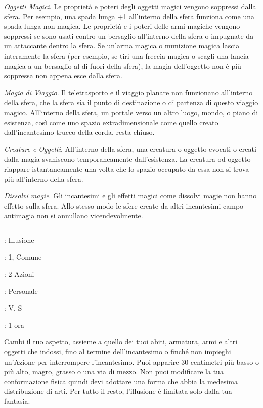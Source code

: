 \begin{multicols}{2}
\emph{Oggetti Magici}. Le proprietà e poteri degli oggetti magici vengono soppressi dalla sfera. Per esempio, una spada lunga +1 all'interno della sfera funziona come una spada lunga non magica. Le proprietà e i poteri delle armi magiche vengono soppressi se sono usati contro un bersaglio all'interno della sfera o impugnate da un attaccante dentro la sfera. Se un'arma magica o munizione magica lascia interamente la sfera (per esempio, se tiri una freccia magica o scagli una lancia magica a un bersaglio al di fuori della sfera), la magia dell'oggetto non è più soppressa non appena esce dalla sfera.

\emph{Magia di Viaggio}. Il teletrasporto e il viaggio planare non funzionano all'interno della sfera, che la sfera sia il punto di destinazione o di partenza di questo viaggio magico. All'interno della sfera, un portale verso un altro luogo, mondo, o piano di esistenza, così come uno spazio extradimensionale come quello creato dall'incantesimo trucco della corda, resta chiuso.

\emph{Creature e Oggetti}. All'interno della sfera, una creatura o oggetto evocati o creati dalla magia svaniscono temporaneamente dall'esistenza. La creatura od oggetto riappare istantaneamente una volta che lo spazio occupato da essa non si trova più all'interno della sfera.

\emph{Dissolvi magie}. Gli incantesimi e gli effetti magici come dissolvi magie non hanno effetto sulla sfera. Allo stesso modo le sfere create da altri incantesimi campo antimagia non si annullano vicendevolmente.

\smallskip\noindent\rule{\linewidth}{2pt} \hypertarget{Camuffare Sé Stesso}{}\medskip{}
\noindent
\begin{description}[noitemsep, topsep=0pt, parsep=0pt, partopsep=0pt, leftmargin=0cm, labelwidth=2.8cm]
	\item[\textbf{Lista di Magia}]: Illusione
	\item[\textbf{Livello}]: 1, Comune
	\item[\textbf{T. di Lancio}]: 2 Azioni
	\item[\textbf{Gittata}]: Personale
	\item[\textbf{Componenti}]: V, S
	\item[\textbf{Durata}]: 1 ora
\end{description}

Cambi il tuo aspetto, assieme a quello dei tuoi abiti, armatura, armi e altri oggetti che indossi, fino al termine dell'incantesimo o finché non impieghi un'Azione per interrompere l'incantesimo. Puoi apparire 30 centimetri più basso o più alto, magro, grasso o una via di mezzo. Non puoi modificare la tua conformazione fisica quindi devi adottare una forma che abbia la medesima distribuzione di arti. Per tutto il resto, l'illusione è limitata solo dalla tua fantasia.


\end{multicols}
